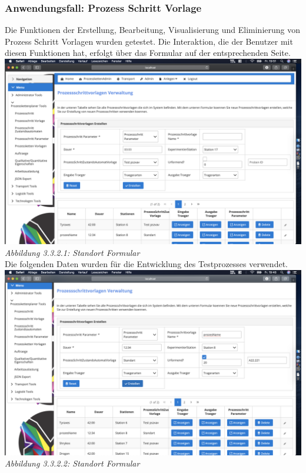 \documentclass[enabledeprecatedfontcommands,fontsize=12pt,paper=a4,twoside]{scrartcl}
\begin{document}
\subsubsection{Anwendungsfall: Prozess Schritt Vorlage}

Die Funktionen der Erstellung, Bearbeitung, Visualisierung und Eliminierung von Prozess Schritt Vorlagen wurden getestet. Die Interaktion, die der Benutzer mit diesen Funktionen hat, erfolgt über das Formular auf der entsprechenden Seite.\\

\hypertarget{sc3.3.2.1}{
\includegraphics[width=1\textwidth]{Screenshots/332formularpzv.png}
\textit{Abbildung 3.3.2.1: Standort Formular}
} \\

Die folgenden Daten wurden für die Entwicklung des Testprozesses verwendet.\\

\hypertarget{sc3.3.2.2}{
\includegraphics[width=1\textwidth]{Screenshots/332DataPzv.png}
\textit{Abbildung 3.3.2.2: Standort Formular}
} \\
\end{document}
